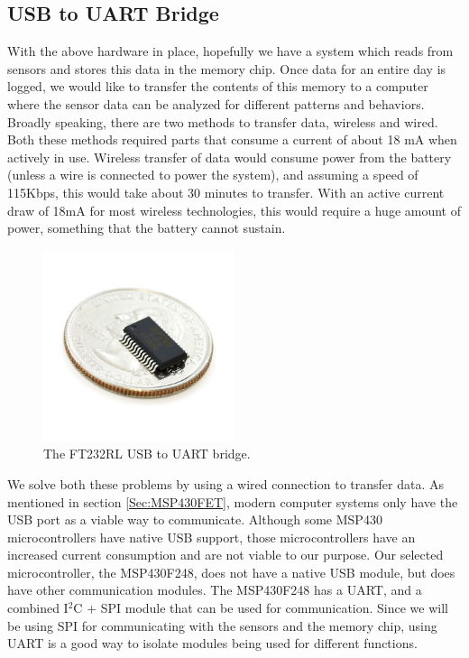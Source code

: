 \subsection{USB to UART Bridge}
\label{Sec:FT232}
With the above hardware in place, hopefully we have a system which reads from sensors and stores this data in the memory chip. Once data for an entire day is logged, we would like to transfer the contents of this memory to a computer where the sensor data can be analyzed for different patterns and behaviors. Broadly speaking, there are two methods to transfer data, wireless and wired. Both these methods required parts that consume a current of about 18 mA when actively in use. Wireless transfer of data would consume power from the battery (unless a wire is connected to power the system), and assuming a speed of 115Kbps, this would take about 30 minutes to transfer. With an active current draw of 18mA for most wireless technologies, this would require a huge amount of power, something that the battery cannot sustain.
\begin{figure}
\begin{center}
\includegraphics[width=0.5\textwidth]{images/FT232coin.jpg}
\caption{The FT232RL USB to UART bridge.}
\label{Fig:FT232}
\end{center}
\end{figure}

We solve both these problems by using a wired connection to transfer data. As mentioned in section \ref{Sec:MSP430FET}, modern computer systems only have the USB port as a viable way to communicate. Although some MSP430 microcontrollers have native USB support, those microcontrollers have an increased current consumption and are not viable to our purpose. Our selected microcontroller, the MSP430F248, does not have a native USB module, but does have other communication modules. The MSP430F248 has a UART, and a combined I$^2$C + SPI module that can be used for communication. Since we will be using SPI for communicating with the sensors and the memory chip, using UART is a good way to isolate modules being used for different functions.

